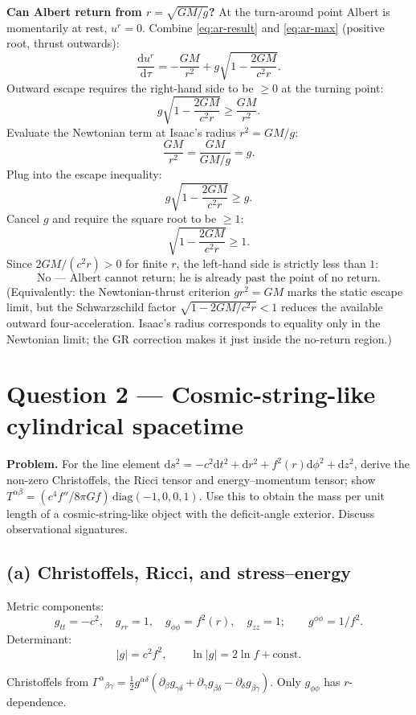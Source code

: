 \documentclass[11pt]{article}
\newcommand{\de}{\mathrm{d}}
\begin{document}
\textbf{Can Albert return from $r=\sqrt{GM/g}$?} At the turn-around point Albert is momentarily at rest, $u^r=0$. Combine \eqref{eq:ar-result} and \eqref{eq:ar-max} (positive root, thrust outwards):
\[
\frac{\de u^r}{\de\tau} = -\frac{GM}{r^2} + g\sqrt{1 - \frac{2GM}{c^2 r}}.
\]
Outward escape requires the right-hand side to be $\ge 0$ at the turning point:
\[
g\sqrt{1 - \frac{2GM}{c^2 r}} \ge \frac{GM}{r^2}.
\]
Evaluate the Newtonian term at Isaac's radius $r^2 = GM/g$:
\[
\frac{GM}{r^2} = \frac{GM}{GM/g} = g.
\]
Plug into the escape inequality:
\[
g\sqrt{1 - \frac{2GM}{c^2 r}} \ge g.
\]
Cancel $g$ and require the square root to be $\ge 1$:
\[
\sqrt{1 - \frac{2GM}{c^2 r}} \ge 1.
\]
Since $2GM/(c^2 r)>0$ for finite $r$, the left-hand side is strictly less than $1$:
\[
\boxed{\;\text{No --- Albert cannot return; he is already past the point of no return.}\;}
\]
(Equivalently: the Newtonian-thrust criterion $g r^2 = GM$ marks the static escape limit, but the Schwarzschild factor $\sqrt{1-2GM/c^2 r}<1$ reduces the available outward four-acceleration. Isaac's radius corresponds to equality only in the Newtonian limit; the GR correction makes it just inside the no-return region.)

\section*{Question 2 --- Cosmic-string-like cylindrical spacetime}

\textbf{Problem.} For the line element $\de s^2 = -c^2\de t^2 + \de r^2 + f^2(r)\de\phi^2 + \de z^2$, derive the non-zero Christoffels, the Ricci tensor and energy--momentum tensor; show $T^{\alpha\beta}=(c^4 f''/8\pi G f)\,\text{diag}(-1,0,0,1)$. Use this to obtain the mass per unit length of a cosmic-string-like object with the deficit-angle exterior. Discuss observational signatures.

\subsection*{(a) Christoffels, Ricci, and stress--energy}

Metric components:
\[
g_{tt} = -c^2,\quad g_{rr}=1,\quad g_{\phi\phi}=f^2(r),\quad g_{zz}=1;\qquad g^{\phi\phi}=1/f^2.
\]
Determinant:
\[
|g| = c^2 f^2,\qquad \ln|g| = 2\ln f + \text{const}.
\]

Christoffels from $\Gamma^\alpha{}_{\beta\gamma} = \tfrac12 g^{\alpha\delta}(\partial_\beta g_{\gamma\delta}+\partial_\gamma g_{\beta\delta}-\partial_\delta g_{\beta\gamma})$. Only $g_{\phi\phi}$ has $r$-dependence.
\end{document}
